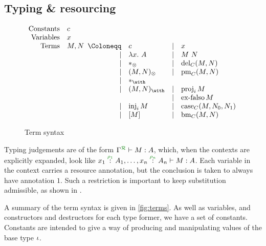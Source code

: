 \subsection{Typing \& resourcing}

\begin{figure}
  \begin{displaymath}
    \begin{array}{rl}
      \textrm{Constants} & c \\
      \textrm{Variables} & x \\
      \textrm{Terms} & M, N
                       \begin{array}[t]{rlcl}
                         \Coloneqq & c & \mid & x \\
                         \mid & \lam{x}{A} & \mid & \app{M}{N} \\
                         \mid & \unit & \mid & \del{C}{M}{N} \\
                         \mid & \ten{M}{N} & \mid & \prm{C}{M}{x}{y}{N} \\
                         \mid & \eat & & \\
                         \mid & \wth{M}{N} & \mid & \proj{i}{M} \\
                                   & & \mid & \exf{C}{M} \\ 
                         \mid & \inj{i}{M} & \mid & \cse{C}{M}{x}{N_0}{y}{N_1} \\
                         \mid & \bang{M} & \mid & \bm{C}{M}{x}{N}
                       \end{array}
    \end{array}
  \end{displaymath}
  \caption{Term syntax}
  \label{fig:terms}
\end{figure}

Typing judgements are of the form $\ctx{\Gamma}{R} \vdash M : A$, which, when
the contexts are explicitly expanded, look like
$\ctxvar{x_1}{A_1}{\rho_1}, \ldots, \ctxvar{x_n}{A_n}{\rho_n} \vdash M : A$.
Each variable in the context carries a resource annotation, but the conclusion
is taken to always have annotation $1$.
Such a restriction is important to keep substitution admissible, as shown in
\cite{quantitative-type-theory}.

A summary of the term syntax is given in \autoref{fig:terms}.
As well as variables, and constructors and destructors for each type former, we
have a set of constants.
Constants are intended to give a way of producing and manipulating values of the
base type $\iota$.

